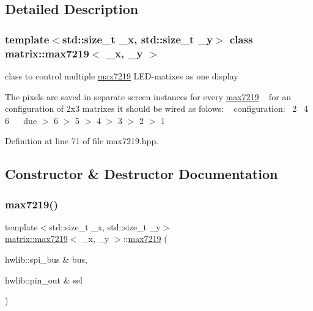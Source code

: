 \subsection{Detailed Description}
\subsubsection*{template$<$std\+::size\+\_\+t \+\_\+x, std\+::size\+\_\+t \+\_\+y$>$\newline
class matrix\+::max7219$<$ \+\_\+x, \+\_\+y $>$}

class to control multiple \mbox{\hyperlink{classmatrix_1_1max7219}{max7219}} L\+E\+D-\/matixes as one display 

The pixels are saved in separate screen instances for every \mbox{\hyperlink{classmatrix_1_1max7219}{max7219}} ~\newline
for an configuration of 2x3 matrixes it should be wired as folows\+: ~\newline
configuration\+:~ 2~ 4~ 6~\newline
~\newline
due $>$ 6 $>$ 5 $>$ 4 $>$ 3 $>$ 2 $>$ 1 

Definition at line 71 of file max7219.\+hpp.



\subsection{Constructor \& Destructor Documentation}
\mbox{\label{classmatrix_1_1max7219_a7b922b6a730b7288d7e096e9c3c5b684}} 
\subsubsection{\texorpdfstring{max7219()}{max7219()}}
{\footnotesize\ttfamily template$<$std\+::size\+\_\+t \+\_\+x, std\+::size\+\_\+t \+\_\+y$>$ \\
\mbox{\hyperlink{classmatrix_1_1max7219}{matrix\+::max7219}}$<$ \+\_\+x, \+\_\+y $>$\+::\mbox{\hyperlink{classmatrix_1_1max7219}{max7219}} (\begin{DoxyParamCaption}\item[{hwlib\+::spi\+\_\+bus \&}]{bus,  }\item[{hwlib\+::pin\+\_\+out \&}]{sel }\end{DoxyParamCaption})\hspace{0.3cm}{\ttfamily [inline]}}



